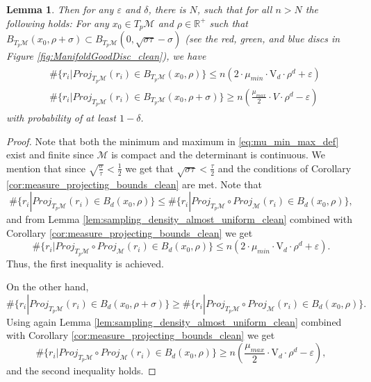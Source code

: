 \documentclass[12pt]{article}
\newtheorem{Lemma}[Theorem]{Lemma}
\theoremstyle{remark}
\newcommand{\RR}{\mathbb{R}}
\newcommand{\MM}{\mathcal{M}}
\newcommand{\eps}{\varepsilon}
\newcommand{\emphbrackets}[1]{\emph{(}#1\emph{)}}
\begin{document}
\begin{appendices}
\begin{Lemma}
    Then for any $\eps$ and $\delta$, there is $N$, such that for all $n>N$ the following holds: For any $x_0\in T_p\MM$ and $\rho \in \RR^+$ such that $B_{T_p\MM}(x_0,\rho + \sigma)\subset  B_{T_p\MM}(0,\sqrt{\sigma\tau}- \sigma)$ \emphbrackets{see the red, green, and blue discs in Figure \ref{fig:ManifoldGoodDisc_clean}}, we have 
\begin{align*}
\begin{split}
&\#\{r_i|Proj_{T_p\MM}(r_i) \in B_{T_p\MM}(x_0,\rho) \}
\leq
n(2\cdot \mu_{min}\cdot \mathrm{V}_d \cdot\rho^d+\eps) \\
&\#\{r_i|Proj_{T_p\MM}(r_i) \in B_{T_p\MM}(x_0,\rho+\sigma) \}
\geq
n \left(\frac{\mu_{max}}{2}\cdot V \cdot \rho^d - \eps\right)
\end{split}
\end{align*}
with probability of at least $1-\delta$.
\end{Lemma}


\begin{proof}
    Note that both the minimum and maximum in \eqref{eq:mu_min_max_def} exist and finite since $ \MM $ is compact and the determinant is continuous.
	We mention that since $ \sqrt{\frac{\sigma}{\tau}} < \frac{1}{2} $ we get that $ \sqrt{\sigma \tau} < \frac{\tau}{2} $ and the conditions of Corollary \ref{cor:measure_projecting_bounds_clean} are met.
	Note that 
	\[
	\#\{r_i|Proj_{T_p\MM}(r_i) \in B_d(x_0,\rho) \} \leq \#\{r_i|Proj_{T_p\MM}\circ Proj_\MM(r_i) \in B_d(x_0,\rho) \}
	,\]
	and from Lemma \ref{lem:sampling_density_almost_uniform_clean} combined with Corollary \ref{cor:measure_projecting_bounds_clean} we get
	\[
	\#\{r_i|Proj_{T_p\MM}\circ Proj_\MM(r_i) \in B_d(x_0,\rho) \} \leq n(2\cdot \mu_{min}\cdot \mathrm{V}_d \cdot\rho^d+\eps)
	.\]
	Thus, the first inequality is achieved.
	
	On the other hand,
	\[
	\#\{r_i|Proj_{T_p\MM}(r_i) \in B_d(x_0,\rho+\sigma) \}
	\geq \#\{r_i|Proj_{T_p\MM}\circ Proj_\MM(r_i) \in B_d(x_0,\rho)\}
	.\]
	Using again Lemma \ref{lem:sampling_density_almost_uniform_clean} combined with Corollary \ref{cor:measure_projecting_bounds_clean} we get
	\[
	\#\{r_i|Proj_{T_p\MM}\circ Proj_\MM(r_i) \in B_d(x_0,\rho)\} \geq n \left(\frac{\mu_{max}}{2}\cdot \mathrm{V}_{d} \cdot \rho^d - \eps\right)
	,\]
	and the second inequality holds.
\end{proof}




\end{appendices}
\end{document}

